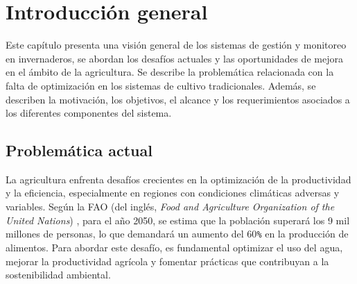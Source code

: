 
\chapter{Introducción general} %

\label{Chapter1} %
\label{IntroGeneral}

Este capítulo presenta una visión general de los sistemas de gestión y
monitoreo en invernaderos, se abordan los desafíos actuales y las oportunidades
de mejora en el ámbito de la agricultura. Se describe la problemática
relacionada con la falta de optimización en los sistemas de cultivo
tradicionales. Además, se describen la motivación, los objetivos, el alcance y
los requerimientos asociados a los diferentes componentes del sistema.


\newcommand{\keyword}[1]{\textbf{#1}}
\newcommand{\tabhead}[1]{\textbf{#1}}
\newcommand{\code}[1]{\texttt{#1}}
\newcommand{\file}[1]{\texttt{\bfseries#1}}
\newcommand{\option}[1]{\texttt{\itshape#1}}
\newcommand{\grados}{$^{\circ}$}



\section{Problemática actual}

La agricultura enfrenta desafíos crecientes en la optimización de la
productividad y la eficiencia, especialmente en regiones con condiciones
climáticas adversas y variables. Según la FAO (del inglés, \textit{Food and Agriculture
      Organization of the United Nations}) \cite{GAPReport2016}, para el año 2050, se
estima que la población superará los 9 mil millones de personas, lo que
demandará un aumento del 60\code{\%} en la producción de alimentos. Para
abordar este desafío, es fundamental optimizar el uso del agua, mejorar la
productividad agrícola y fomentar prácticas que contribuyan a la sostenibilidad
ambiental.


